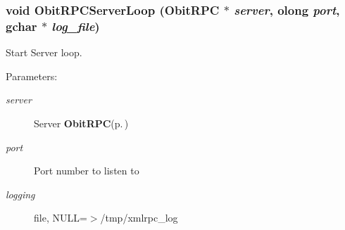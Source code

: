 \subsubsection{\setlength{\rightskip}{0pt plus 5cm}void Obit\-RPCServer\-Loop ({\bf Obit\-RPC} $\ast$ {\em server}, {\bf olong} {\em port}, gchar $\ast$ {\em log\_\-file})}\label{ObitRPC_8c_a15}


Start Server loop. 

\begin{Desc}
\item[Parameters:]
\begin{description}
\item[{\em server}]Server {\bf Obit\-RPC}{\rm (p.\,\pageref{structObitRPC})} \item[{\em port}]Port number to listen to \item[{\em logging}]file, NULL=$>$/tmp/xmlrpc\_\-log \end{description}
\end{Desc}
